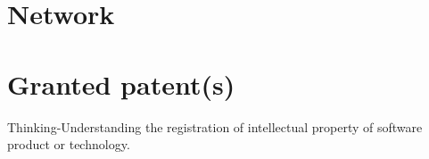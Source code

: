 \documentclass{moderncv}
\begin{document}
\section{Network}



\section{Granted patent(s)}

Thinking-Understanding the registration of intellectual property of software product or technology.
\end{document}
